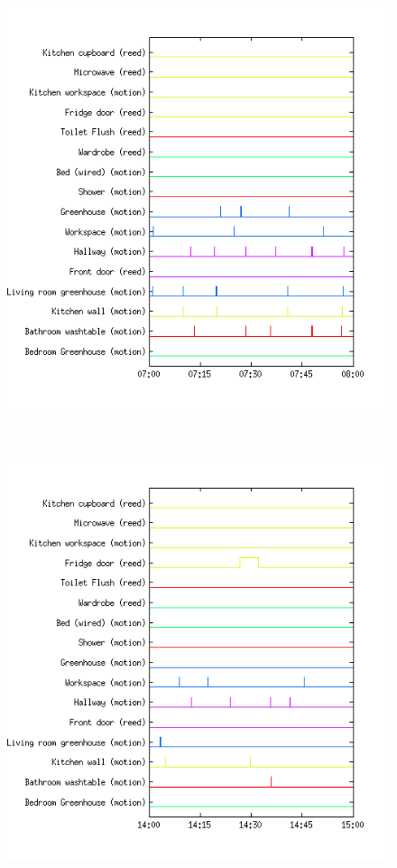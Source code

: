 \begin{figure}[h!]
   \centering
   \begin{minipage}[b]{0.45\textwidth}
     \centering
     \includegraphics[width=\textwidth]{Pictures/SensorsMorningHN3Day34.png}
   \end{minipage}
   ~
   \begin{minipage}[b]{0.45\textwidth}
     \centering
     \includegraphics[width=\textwidth]{Pictures/SensorsNoonHN3Day34.png}

\end{minipage}
\end{figure}
